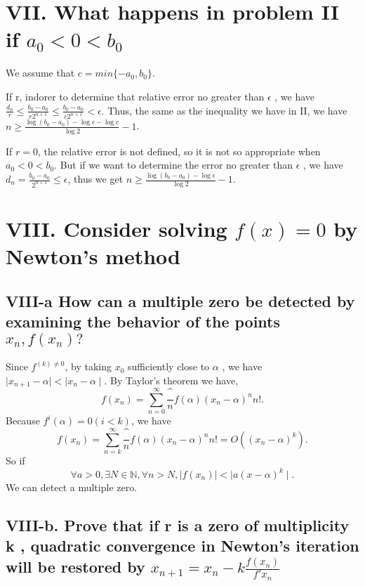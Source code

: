 \documentclass[twoside,a4paper]{article}
\begin{document}
\section*{VII. What happens in problem II if $a_0<0<b_0$}

We assume that $c=min\{-a_0, b_0\}$.

If r, indorer to determine that relative error no greater than $\epsilon$
, we have $ \frac{d_{n}}{r}\le \frac{b_{0}-a_{0}}{r2^{n+1}}
\le \frac{b_0-a_0}{c2^{n+1}}<\epsilon$.
Thus, the same as the inequality we have in II, we have
$n\ge \frac{\log\left( b_0-a_0 \right)-\log\epsilon-\log c }{\log 2}-1$.

If $r=0$, the relative error is not defined, so it is not so appropriate 
when  $a_0<0<b_0$. But if we want to determine the error no greater than $\epsilon$
, we have  $d_{n}=\frac{b_0-a_0}{2^{n+1}}\le \epsilon$, thus we get 
$n\ge \frac{\log\left( b_0-a_0 \right)-\log \epsilon }{\log 2}-1$.

\section*{VIII. Consider solving $f\left( x \right)=0 $ by Newton's method}

\subsection*{VIII-a \small{How can a multiple zero be detected by examining the behavior of the points $x_{n}, f\left( x_{n} \right)?$}}

Since $f^{\left( k \right)\neq 0 }$, by taking $x_0$ sufficiently close to $\alpha$
, we have $ \mid  x_{n+1}-\alpha \mid < \mid x_{n}-\alpha \mid $.
By Taylor's theorem we have, 
\[
	f\left( x_{n}\right)=\sum_{n=0}^{\infty} 
	\frac^{n}{f\left(  \alpha\right)\left( x_{n}-\alpha\right)^{n}  }{n!} 
.\] 
Because $f^{i}\left( \alpha \right) =0\left(  i<k\right) $, we have
\[
	f\left( x_{n}\right)=\sum_{n=k}^{\infty} 
	\frac^{n}{f\left(  \alpha\right)\left( x_{n}-\alpha\right)^{n}  }{n!}
	=O\left( (x_{n}-\alpha)^{k} \right) 
.\] 
So if 
\[
	\forall a>0 , \exists N\in\mathbb{N}, \forall n>N
	, \mid f\left( x_{n} \right) \mid <  \mid a\left( x-\alpha \right)^k   \mid        
.
\]
We can detect a multiple zero.

\subsection*{VIII-b. \small{Prove that if r is a zero of multiplicity k
, quadratic convergence in Newton's iteration will be restored by 
$x_{n+1}=x_{n}-k\frac{f\left( x_{n} \right) }{f'{x_{n}}}$}}
\end{document}
